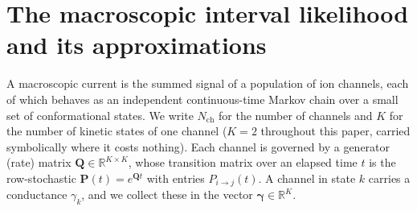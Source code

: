 \section*{The macroscopic interval likelihood and its approximations}

A macroscopic current is the summed signal of a population of ion channels, each of
which behaves as an independent continuous-time Markov chain over a small set of
conformational states. We write $N_{\mathrm{ch}}$ for the number of channels and $K$ for
the number of kinetic states of one channel ($K=2$ throughout this paper, carried %
symbolically where it costs nothing). Each channel is governed by a generator (rate)
matrix $\mathbf{Q}\in\mathbb{R}^{K\times K}$, whose transition matrix over an elapsed time
$t$ is the row-stochastic $\mathbf{P}(t)=e^{\mathbf{Q}t}$ with entries $P_{i\to j}(t)$. A
channel in state $k$ carries a conductance $\gamma_k$, and we collect these in the vector
$\bm{\gamma}\in\mathbb{R}^{K}$.

